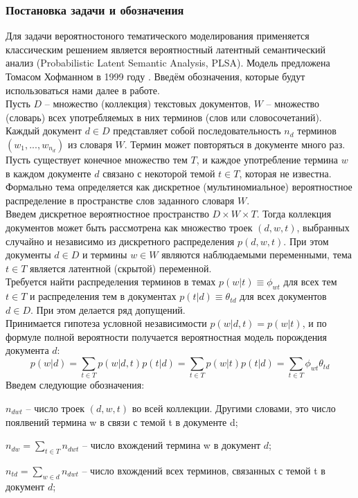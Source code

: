 \documentclass[12pt]{article}
\begin{document}
\subsubsection{Постановка задачи и обозначения}
Для  задачи вероятностоного тематического моделирования применяется  классическим решением является вероятностный латентный семантический анализ (Probabilistic Latent Semantic Analysis, PLSA). Модель предложена Томасом Хофманном в 1999 году \cite{plsadef2}. Введём обозначения, которые будут использоваться нами далее в работе.\\
Пусть $D$ -- множество (коллекция) текстовых документов, $W$ -- множество (словарь) всех употребляемых в них терминов (слов или словосочетаний). Каждый документ $d \in D$ представляет собой последовательность $n_d$ терминов $(w_1, . . . , w_{n_d})$ из словаря $W$. Термин может повторяться в документе много раз.
Пусть существует конечное множество тем $T$, и каждое употребление термина $w$ в каждом документе $d$ связано с некоторой темой $t \in T$, которая не известна. Формально тема определяется как дискретное (мультиномиальное) вероятностное распределение в пространстве слов заданного словаря $W$.\\
Введем дискретное вероятностное пространство $D \times W \times T$. Тогда коллекция документов может быть рассмотрена как множество троек $(d, w, t)$, выбранных случайно и независимо из дискретного распределения $p(d, w, t)$. При этом документы $d \in D$ и термины $w \in W$ являются наблюдаемыми переменными, тема $t \in T$ является латентной (скрытой) переменной.\\
Требуется найти распределения терминов в темах $p(w|t) \equiv \phi_{wt}$ для всех тем $t \in T$ и распределения тем в документах $p(t|d) \equiv \theta_{td}$ для всех документов $d \in D$. При этом делается ряд допущений.\\
Принимается гипотеза условной независимости $p(w|d,t) = p(w|t)$, и  по формуле полной вероятности получается вероятностная модель порождения документа $d$:
\[
p(w|d) = \sum_{t \in T} p(w|d,t)p(t|d) = \sum_{t \in T}p(w|t)p(t|d)=\sum_{t \in T}\phi_{wt}\theta_{td}
\]
Введем следующие обозначения:

$n_{dwt}$ -- число троек $(d,w,t)$ во всей коллекции. Другими словами, это число поялвений термина w в связи с темой t в документе d;

$n_{dw} = \sum_{t \in T} n_{dwt}$ -- число вхождений термина w в документ $d$;

$n_{td} = \sum_{w \in d} n_{dwt}$ -- число вхождений всех терминов, связанных с темой t в документ $d$;
\end{document}
